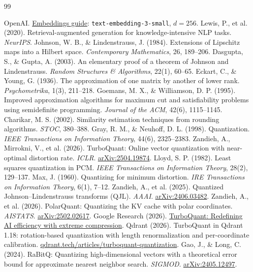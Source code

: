 \documentclass[11pt]{article}
\begin{document}
\clearpage
\begin{thebibliography}{99}

 OpenAI. \href{https://platform.openai.com/docs/guides/embeddings}{Embeddings guide}: \texttt{text-embedding-3-small}, $d = 256$.
 Lewis, P., et al. (2020). Retrieval-augmented generation for knowledge-intensive NLP tasks. \emph{NeurIPS}.
 Johnson, W. B., \& Lindenstrauss, J. (1984). Extensions of Lipschitz maps into a Hilbert space. \emph{Contemporary Mathematics}, 26, 189--206.
 Dasgupta, S., \& Gupta, A. (2003). An elementary proof of a theorem of Johnson and Lindenstrauss. \emph{Random Structures \& Algorithms}, 22(1), 60--65.
 Eckart, C., \& Young, G. (1936). The approximation of one matrix by another of lower rank. \emph{Psychometrika}, 1(3), 211--218.
 Goemans, M. X., \& Williamson, D. P. (1995). Improved approximation algorithms for maximum cut and satisfiability problems using semidefinite programming. \emph{Journal of the ACM}, 42(6), 1115--1145.
 Charikar, M. S. (2002). Similarity estimation techniques from rounding algorithms. \emph{STOC}, 380--388.
 Gray, R. M., \& Neuhoff, D. L. (1998). Quantization. \emph{IEEE Transactions on Information Theory}, 44(6), 2325--2383.
 Zandieh, A., Mirrokni, V., et al. (2026). TurboQuant: Online vector quantization with near-optimal distortion rate. \emph{ICLR}. \href{https://arxiv.org/abs/2504.19874}{arXiv:2504.19874}.
 Lloyd, S. P. (1982). Least squares quantization in PCM. \emph{IEEE Transactions on Information Theory}, 28(2), 129--137.
 Max, J. (1960). Quantizing for minimum distortion. \emph{IRE Transactions on Information Theory}, 6(1), 7--12.
 Zandieh, A., et al. (2025). Quantized Johnson--Lindenstrauss transforms (QJL). \emph{AAAI}. \href{https://arxiv.org/abs/2406.03482}{arXiv:2406.03482}.
 Zandieh, A., et al. (2026). PolarQuant: Quantizing the KV cache with polar coordinates. \emph{AISTATS}. \href{https://arxiv.org/abs/2502.02617}{arXiv:2502.02617}.
 Google Research (2026). \href{https://research.google/blog/turboquant-redefining-ai-efficiency-with-extreme-compression/}{TurboQuant: Redefining AI efficiency with extreme compression}.
 Qdrant (2026). TurboQuant in Qdrant 1.18: rotation-based quantization with length renormalization and per-coordinate calibration. \href{https://qdrant.tech/articles/turboquant-quantization/}{qdrant.tech/articles/turboquant-quantization}.
 Gao, J., \& Long, C. (2024). RaBitQ: Quantizing high-dimensional vectors with a theoretical error bound for approximate nearest neighbor search. \emph{SIGMOD}. \href{https://arxiv.org/abs/2405.12497}{arXiv:2405.12497}.

\end{thebibliography}
\end{document}
